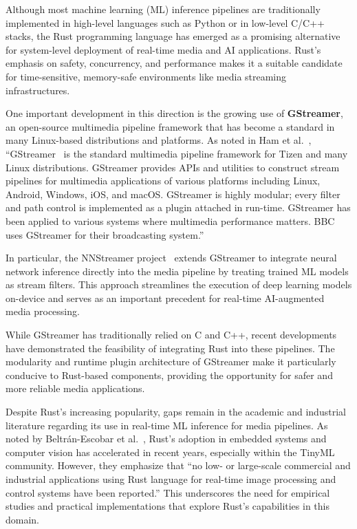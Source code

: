 Although most machine learning (ML) inference pipelines are traditionally implemented in high-level languages such as Python or in low-level C/C++ stacks, the Rust programming language has emerged as a promising alternative for system-level deployment of real-time media and AI applications. Rust's emphasis on safety, concurrency, and performance makes it a suitable candidate for time-sensitive, memory-safe environments like media streaming infrastructures.

One important development in this direction is the growing use of \textbf{GStreamer}, an open-source multimedia pipeline framework that has become a standard in many Linux-based distributions and platforms. As noted in Ham et al.~\cite{ham2019nnstreamer}, ``GStreamer~\cite{gstreamer1999} is the standard multimedia pipeline framework for Tizen and many Linux distributions. GStreamer provides APIs and utilities to construct stream pipelines for multimedia applications of various platforms including Linux, Android, Windows, iOS, and macOS. GStreamer is highly modular; every filter and path control is implemented as a plugin attached in run-time. GStreamer has been applied to various systems where multimedia performance matters. BBC uses GStreamer for their broadcasting system.''

In particular, the NNStreamer project~\cite{ham2019nnstreamer} extends GStreamer to integrate neural network inference directly into the media pipeline by treating trained ML models as stream filters. This approach streamlines the execution of deep learning models on-device and serves as an important precedent for real-time AI-augmented media processing.

While GStreamer has traditionally relied on C and C++, recent developments have demonstrated the feasibility of integrating Rust into these pipelines. The modularity and runtime plugin architecture of GStreamer make it particularly conducive to Rust-based components, providing the opportunity for safer and more reliable media applications.

Despite Rust's increasing popularity, gaps remain in the academic and industrial literature regarding its use in real-time ML inference for media pipelines. As noted by Beltrán-Escobar et al.~\cite{beltran2024review}, Rust's adoption in embedded systems and computer vision has accelerated in recent years, especially within the TinyML community. However, they emphasize that “no low- or large-scale commercial and industrial applications using Rust language for real-time image processing and control systems have been reported.” This underscores the need for empirical studies and practical implementations that explore Rust's capabilities in this domain.

